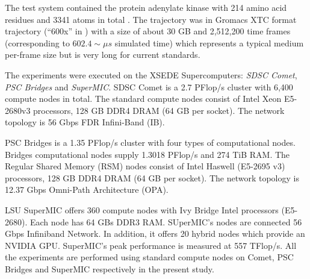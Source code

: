\label{system}
The test system contained the protein adenylate kinase with 214 amino acid residues and 3341 atoms in total \cite{Seyler:2014il}. 
The trajectory \cite{Seyler:2017aa} was in Gromacs XTC format trajectory (``600x'' in \citet{Khoshlessan:2017ab}) with a size of about 30 GB and 2,512,200
time frames (corresponding to $602.4 \sim \mu s$ simulated time) which represents a typical medium per-frame size but is very long for
current standards.

The experiments were executed on the XSEDE Supercomputers: \emph{SDSC Comet}, 
\emph{PSC Bridges} and \emph{SuperMIC}. SDSC Comet is a 2.7 PFlop/s cluster with 
6,400 compute nodes in total. The standard compute nodes consist of Intel Xeon 
E5-2680v3 processors, 128 GB DDR4 DRAM (64 GB per socket). The network topology 
is 56 Gbps FDR Infini-Band (IB).

PSC Bridges is a 1.35 PFlop/s cluster with four types of computational nodes. Bridges 
computational nodes supply 1.3018 PFlop/s and 274 TiB RAM. The Regular Shared 
Memory (RSM) nodes consist of Intel Haswell (E5-2695 v3) processors, 128 GB DDR4 
DRAM (64 GB per socket). The network topology is 12.37 Gbps Omni-Path Architecture 
(OPA).

LSU SuperMIC offers 360 compute nodes with Ivy Bridge Intel processors (E5-2680).
Each node has 64 GBs DDR3 RAM. SUperMIC's nodes are connected 56 Gbps Infiniband 
Network. In addition, it offers 20 hybrid nodes which provide an NVIDIA GPU. SuperMIC's
peak performance is measured at 557 TFlop/s.
All the experiments are performed using standard compute nodes on Comet, PSC Bridges and SuperMIC respectively in the present study.


